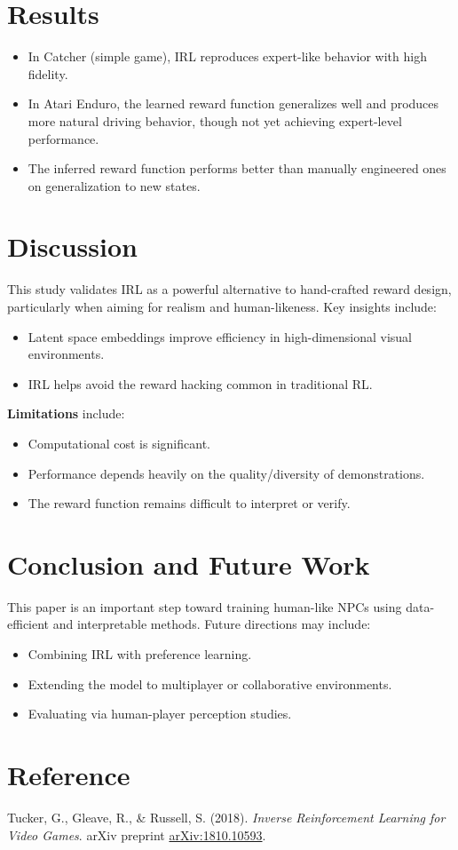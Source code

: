 \documentclass[12pt,a4paper]{article}
\begin{document}
\section*{Results}

\begin{itemize}
  \item In Catcher (simple game), IRL reproduces expert-like behavior with high fidelity.
  \item In Atari Enduro, the learned reward function generalizes well and produces more natural driving behavior, though not yet achieving expert-level performance.
  \item The inferred reward function performs better than manually engineered ones on generalization to new states.
\end{itemize}

\section*{Discussion}

This study validates IRL as a powerful alternative to hand-crafted reward design, particularly when aiming for realism and human-likeness. Key insights include:
\begin{itemize}
  \item Latent space embeddings improve efficiency in high-dimensional visual environments.
  \item IRL helps avoid the reward hacking common in traditional RL.
\end{itemize}

\textbf{Limitations} include:
\begin{itemize}
  \item Computational cost is significant.
  \item Performance depends heavily on the quality/diversity of demonstrations.
  \item The reward function remains difficult to interpret or verify.
\end{itemize}

\section*{Conclusion and Future Work}

This paper is an important step toward training human-like NPCs using data-efficient and interpretable methods. Future directions may include:
\begin{itemize}
  \item Combining IRL with preference learning.
  \item Extending the model to multiplayer or collaborative environments.
  \item Evaluating via human-player perception studies.
\end{itemize}

\section*{Reference}

\noindent Tucker, G., Gleave, R., \& Russell, S. (2018). \textit{Inverse Reinforcement Learning for Video Games}. arXiv preprint \href{https://arxiv.org/abs/1810.10593}{arXiv:1810.10593}.
\end{document}
